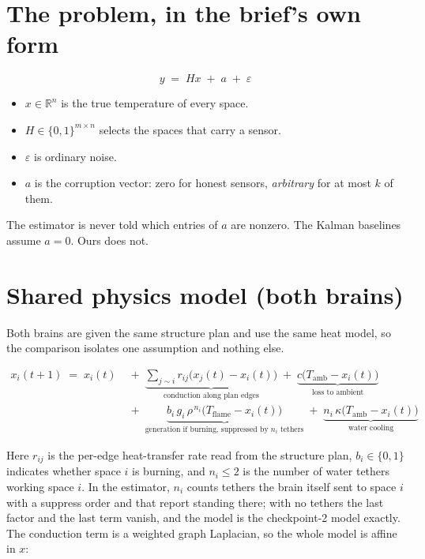\documentclass[11pt]{article}
\newcommand{\Tamb}{T_{\mathrm{amb}}}
\newcommand{\Tflame}{T_{\mathrm{flame}}}
\newcommand{\R}{\mathbb{R}}
\begin{document}
\clearpage

\section{The problem, in the brief's own form}

\begin{equation}
  y \;=\; Hx \;+\; a \;+\; \varepsilon
\end{equation}

\begin{itemize}[leftmargin=1.4em,itemsep=2pt]
  \item $x \in \R^{n}$ is the true temperature of every space.
  \item $H \in \{0,1\}^{m \times n}$ selects the spaces that carry a sensor.
  \item $\varepsilon$ is ordinary noise.
  \item $a$ is the corruption vector: zero for honest sensors, \emph{arbitrary} for at most $k$ of them.
\end{itemize}

The estimator is never told which entries of $a$ are nonzero. The Kalman baselines assume $a = 0$. Ours does not.

\section{Shared physics model (both brains)}

Both brains are given the same structure plan and use the same heat model, so the comparison isolates one assumption and nothing else.

\begin{equation}
\begin{aligned}
  x_i(t{+}1) \;=\; x_i(t)
  &\;+\; \underbrace{\sum_{j \sim i} r_{ij}\bigl(x_j(t) - x_i(t)\bigr)}_{\text{conduction along plan edges}}
  \;+\; \underbrace{c\bigl(\Tamb - x_i(t)\bigr)}_{\text{loss to ambient}} \\[6pt]
  &\;+\; \underbrace{b_i \, g_i\, \rho^{\,n_i} \bigl(\Tflame - x_i(t)\bigr)}_{\text{generation if burning, suppressed by } n_i \text{ tethers}}
  \;+\; \underbrace{n_i\,\kappa\bigl(\Tamb - x_i(t)\bigr)}_{\text{water cooling}}
\end{aligned}
\end{equation}

Here $r_{ij}$ is the per-edge heat-transfer rate read from the structure plan, $b_i \in \{0,1\}$ indicates whether space $i$ is burning, and $n_i \le 2$ is the number of water tethers working space $i$. In the estimator, $n_i$ counts tethers the brain itself sent to space $i$ with a suppress order and that report standing there; with no tethers the last factor and the last term vanish, and the model is the checkpoint-2 model exactly. The conduction term is a weighted graph Laplacian, so the whole model is affine in $x$:
\end{document}
